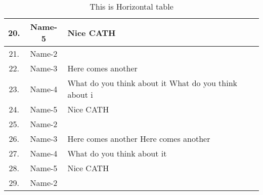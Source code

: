 \documentclass{article}
\begin{document}
\begin{sidewaystable}[h]
\begin{center}
\begin{tabular}{|c| c| l|}
				20.      & Name-5                        & Nice CATH \\   \hline
				21.      & Name-2                        & \\  \hline
				22.      & Name-3                        & Here comes another \\ \hline
				23.      & Name-4                        & What do you think about it What do you think about i \\  \hline
				24.      & Name-5                        & Nice CATH \\   \hline
				25.      & Name-2                        & \\  \hline
				26.      & Name-3                        & Here comes another  Here comes another\\ \hline
				27.      & Name-4                        & What do you think about it \\  \hline
				28.      & Name-5                        & Nice CATH \\   \hline
				29.      & Name-2                        & \\  \hline		
			\end{tabular}	
		\caption{This is Horizontal table}	
		\end{center}
	\end{sidewaystable}
	
	
	
	
	
\end{document}
